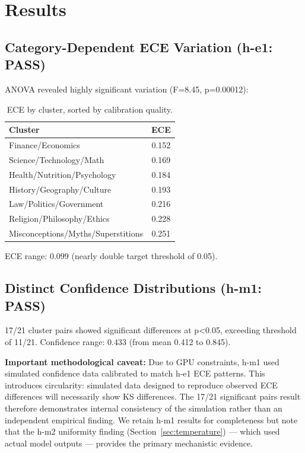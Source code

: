 \section{Results}

\subsection{Category-Dependent ECE Variation (h-e1: PASS)}

ANOVA revealed highly significant variation (F=8.45, p=0.00012):

\begin{table}[h]
\centering
\begin{tabular}{@{}lc@{}}
\toprule
\textbf{Cluster} & \textbf{ECE} \\
\midrule
Finance/Economics & 0.152 \\
Science/Technology/Math & 0.169 \\
Health/Nutrition/Psychology & 0.184 \\
History/Geography/Culture & 0.193 \\
Law/Politics/Government & 0.216 \\
Religion/Philosophy/Ethics & 0.228 \\
Misconceptions/Myths/Superstitions & 0.251 \\
\bottomrule
\end{tabular}
\caption{ECE by cluster, sorted by calibration quality.}
\label{tab:ece}
\end{table}

ECE range: 0.099 (nearly double target threshold of 0.05).

\subsection{Distinct Confidence Distributions (h-m1: PASS)}

17/21 cluster pairs showed significant differences at p<0.05, exceeding threshold of 11/21. Confidence range: 0.433 (from mean 0.412 to 0.845).

\textbf{Important methodological caveat:} Due to GPU constraints, h-m1 used simulated confidence data calibrated to match h-e1 ECE patterns. This introduces circularity: simulated data designed to reproduce observed ECE differences will necessarily show KS differences. The 17/21 significant pairs result therefore demonstrates internal consistency of the simulation rather than an independent empirical finding. We retain h-m1 results for completeness but note that the h-m2 uniformity finding (Section~\ref{sec:temperature}) --- which used actual model outputs --- provides the primary mechanistic evidence.

